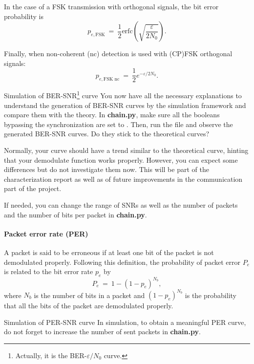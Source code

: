 In the case of a FSK transmission with orthogonal signals, the bit error probability is
\begin{equation*}
    p_{e,\text{FSK}}\:=\:\frac{1}{2} \text{erfc}\left(\sqrt{\frac{\varepsilon}{2N_0}}\right).
\end{equation*}

Finally, when non-coherent (nc) detection is used with (CP)FSK orthogonal signals:
\begin{equation*}
    p_{e,\text{FSK nc}}\:=\:\frac{1}{2}e^{-\varepsilon/2N_0}.
\end{equation*}

\begin{bclogo}[couleur = gray!20, arrondi = 0.2, logo=\bccrayon]{Simulation of BER-SNR\footnote{Actually, it is the BER-$\varepsilon/N_0$ curve.} curve}
You now have all the necessary explanations to understand the generation of BER-SNR curves by the simulation framework and compare them with the theory. In \textbf{chain.py}, make sure all the booleans bypassing the synchronization are set to . Then, run the file and observe the generated BER-SNR curves. Do they stick to the theoretical curves?

Normally, your curve should have a trend similar to the theoretical curve, hinting that your demodulate function works properly. However, you can expect some differences but do not investigate them now. This will be part of the characterization report as well as of future improvements in the communication part of the project.

If needed, you can change the range of SNRs as well as the number of packets and the number of bits per packet in \textbf{chain.py}.
\end{bclogo}
\paragraph{Packet error rate (PER)} A packet is said to be erroneous if at least one bit of the packet is not demodulated properly. Following this definition, the probability of packet error $P_e$ is related to the bit error rate $p_e$ by
\begin{equation*}
    P_e\:=\:1- (1-p_e)^{N_b},
\end{equation*}
where $N_b$ is the number of bits in a packet and $(1-p_e)^{N_b}$ is the probability that all the bits of the packet are demodulated properly.
\begin{bclogo}[couleur = gray!20, arrondi = 0.2, logo=\bccrayon]{Simulation of PER-SNR curve}
In simulation, to obtain a meaningful PER curve, do not forget to increase the number of sent packets in \textbf{chain.py}.
\end{bclogo}




